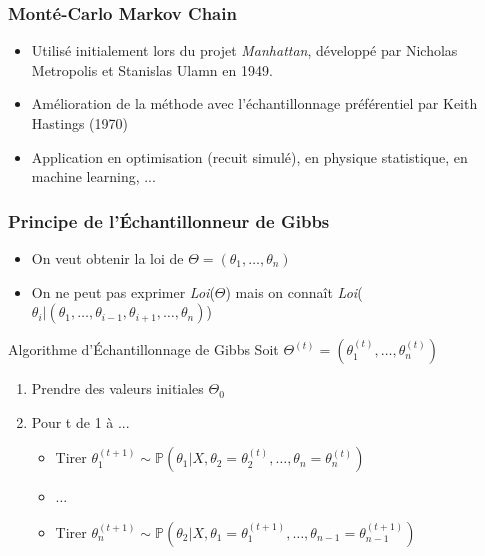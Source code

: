 
\breakingframe{
    \begin{textblock*}{13cm}(3.5cm,4cm)
        
    \textbf{\textcolor{black}{Méthode de Monté-carlo par chaînes de Markov}}
    \end{textblock*}}

\begin{frame}
    
    \frametitle{Monté-Carlo Markov Chain}
        
    \begin{itemize}%
        \item Utilisé initialement lors du projet \textit{Manhattan}, développé par Nicholas Metropolis et Stanislas Ulamn en 1949.
        \item Amélioration de la méthode avec l'échantillonnage préférentiel par Keith Hastings (1970)
        \item Application en optimisation (recuit simulé), en physique statistique, en machine learning, ...
    \end{itemize}

\end{frame}

\begin{frame}
    \frametitle{Principe de l'\'Echantillonneur de Gibbs}
    \begin{itemize}%
    \item On veut obtenir la loi de $\Theta=\left(\theta_{1}, \ldots, \theta_{n}\right)$ \\
    \item On ne peut pas exprimer \textit{Loi}($\Theta$) mais on connaît \textit{Loi}($\theta_i | (\theta_{1}, \dots, \theta_{i-1}, \theta_{i+1}, \dots, \theta_{n})$) 
    
    \end{itemize}
    
    \begin{exampleblock}{Algorithme d'\'Echantillonnage de Gibbs}
        Soit $\Theta^{(t)} = \left(\theta^{(t)}_{1}, \ldots, \theta^{(t)}_{n}\right)$
        \begin{enumerate}
            \item Prendre des valeurs initiales $\Theta_0$
            \item Pour t de 1 à ...
            \begin{itemize}
                \item Tirer  $\theta_{1}^{(t+1)} \sim \mathbb{P}(\theta_{1} | X, \theta_{2}=\theta_{2}^{(t)}, \ldots, \theta_{n}=\theta_{n}^{(t)})$
                \item $\dots$
                \item Tirer $\theta_{n}^{(t+1)} \sim \mathbb{P}(\theta_{2} | X, \theta_{1}=\theta_{1}^{(t+1)}, \ldots, \theta_{n-1}=\theta_{n-1}^{(t+1)})$
            \end{itemize}
        \end{enumerate}
    \end{exampleblock}

\end{frame}

